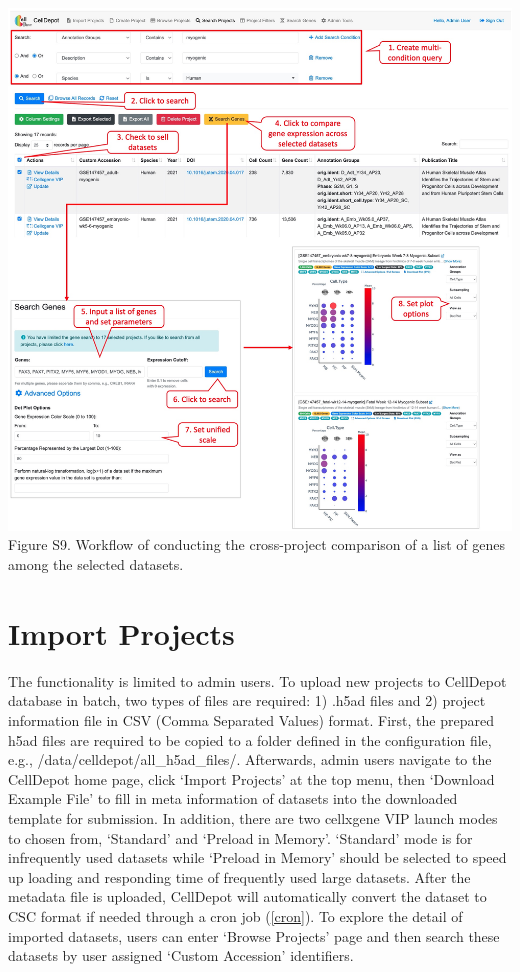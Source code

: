 \documentclass[
  openany]{book}
\begin{document}
\href{figures/S9.jpg}{\includegraphics{figures/S9.jpg}}
Figure S9. Workflow of conducting the cross-project comparison of a list of genes among the selected datasets.

\hypertarget{import}{%
\section{Import Projects}\label{import}}

The functionality is limited to admin users. To upload new projects to CellDepot database in batch, two types of files are required: 1) .h5ad files and 2) project information file in CSV (Comma Separated Values) format. First, the prepared h5ad files are required to be copied to a folder defined in the configuration file, e.g., /data/celldepot/all\_h5ad\_files/. Afterwards, admin users navigate to the CellDepot home page, click `Import Projects' at the top menu, then `Download Example File' to fill in meta information of datasets into the downloaded template for submission. In addition, there are two cellxgene VIP launch modes to chosen from, `Standard' and `Preload in Memory'. `Standard' mode is for infrequently used datasets while `Preload in Memory' should be selected to speed up loading and responding time of frequently used large datasets.
After the metadata file is uploaded, CellDepot will automatically convert the dataset to CSC format if needed through a cron job (\ref{cron}). To explore the detail of imported datasets, users can enter `Browse Projects' page and then search these datasets by user assigned `Custom Accession' identifiers.
\end{document}
